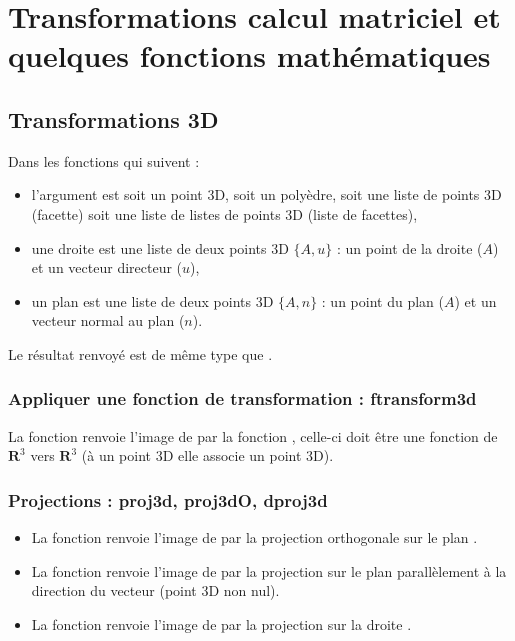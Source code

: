 \section{Transformations calcul matriciel et quelques fonctions mathématiques}

\subsection{Transformations 3D}

Dans les fonctions qui suivent :
\begin{itemize}
    \item l'argument  est soit un point 3D, soit un polyèdre, soit une liste de points 3D (facette) soit une liste de listes de points 3D (liste de facettes),
    \item une droite  est une liste de deux points 3D $\{A,u\}$ : un point de la droite ($A$) et un vecteur directeur ($u$),
    \item un plan  est une liste de deux points 3D $\{A,n\}$ : un point du plan ($A$) et un vecteur normal au plan ($n$).
  \end{itemize}
Le résultat renvoyé est de même type que .
  
\subsubsection{Appliquer une fonction de transformation : ftransform3d}

La fonction  renvoie l'image de  par la fonction , celle-ci  doit être une fonction de $\mathbf R^3$ vers $\mathbf R^3$ (à un point 3D elle associe un point 3D).

\subsubsection{Projections : proj3d, proj3dO, dproj3d}

\begin{itemize}
    \item La fonction  renvoie l'image de  par la projection orthogonale sur le plan .
    \item La fonction  renvoie l'image de  par la projection sur le plan  parallèlement à la direction du vecteur  (point 3D non nul).
    \item La fonction  renvoie l'image de  par la projection sur la droite .
\end{itemize}

